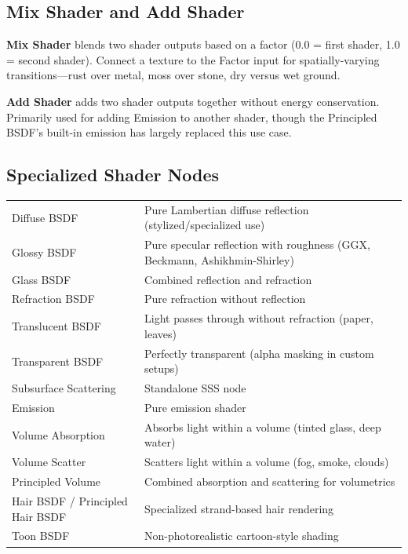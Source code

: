 \subsection{Mix Shader and Add Shader}

\textbf{Mix Shader} blends two shader outputs based on a factor
(0.0 = first shader, 1.0 = second shader). Connect a texture to the
Factor input for spatially-varying transitions---rust over metal,
moss over stone, dry versus wet ground.

\textbf{Add Shader} adds two shader outputs together without energy
conservation. Primarily used for adding Emission to another shader,
though the Principled BSDF's built-in emission has largely replaced
this use case.

\subsection{Specialized Shader Nodes}

\begin{center}
\begin{tabularx}{\textwidth}{L{4cm}X}
\toprule
{}
 &  \\
\midrule
Diffuse BSDF & Pure Lambertian diffuse reflection (stylized/specialized use) \\
Glossy BSDF & Pure specular reflection with roughness (GGX, Beckmann, Ashikhmin-Shirley) \\
Glass BSDF & Combined reflection and refraction \\
Refraction BSDF & Pure refraction without reflection \\
Translucent BSDF & Light passes through without refraction (paper, leaves) \\
Transparent BSDF & Perfectly transparent (alpha masking in custom setups) \\
Subsurface Scattering & Standalone SSS node \\
Emission & Pure emission shader \\
Volume Absorption & Absorbs light within a volume (tinted glass, deep water) \\
Volume Scatter & Scatters light within a volume (fog, smoke, clouds) \\
Principled Volume & Combined absorption and scattering for volumetrics \\
Hair BSDF / Principled Hair BSDF & Specialized strand-based hair rendering \\
Toon BSDF & Non-photorealistic cartoon-style shading \\
\bottomrule
\end{tabularx}
\end{center}

